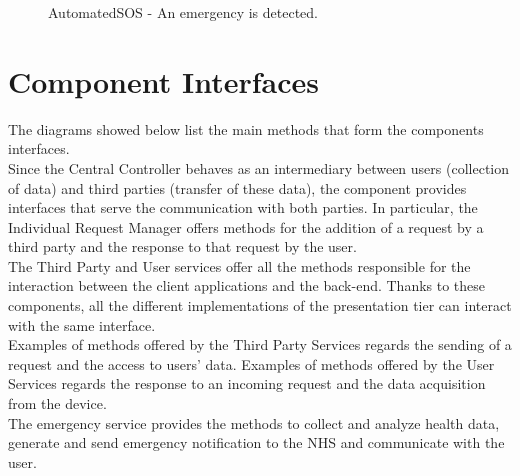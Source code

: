 \begin{figure}[ht]
    \caption{AutomatedSOS - An emergency is detected.}
    \label{RV11}
\end{figure}

\clearpage
\section{Component Interfaces}
The diagrams showed below list the main methods that form the components interfaces.\\
Since the Central Controller behaves as an intermediary between users (collection of data) and third parties (transfer of these data), the component provides interfaces that serve the communication with both parties.
In particular, the Individual Request Manager offers methods for the addition of a request by a third party and the response to that request by the user. \\
The Third Party and User services offer all the methods responsible for the interaction between the client applications and the back-end. Thanks to these components, all the different implementations of the presentation tier can interact with the same interface.\\
Examples of methods offered by the Third Party Services regards the sending of a request and the access to users' data. Examples of methods offered by the User Services regards the response to an incoming request and the data acquisition from the device.\\
The emergency service provides the methods to collect and analyze health data, generate and send emergency notification to the NHS and communicate with the user.\\
\clearpage

